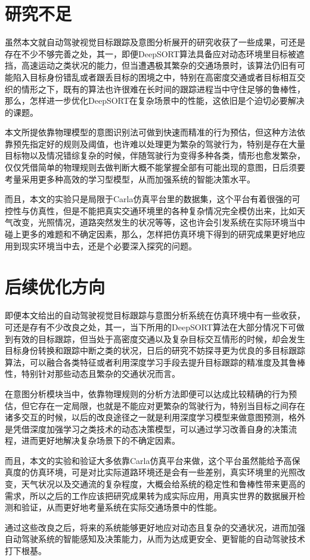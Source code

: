 \section{研究不足}

虽然本文就自动驾驶视觉目标跟踪及意图分析展开的研究收获了一些成果，可还是存在不少不够完善之处，其一，即便DeepSORT算法具备应对动态环境里目标被遮挡，高速运动之类状况的能力，但当遭遇极其繁杂的交通场景时，该算法仍旧有可能陷入目标身份错乱或者跟丢目标的困境之中，特别在高密度交通或者目标相互交织的情形之下，既有的算法也许很难在长时间的跟踪进程当中守住足够的鲁棒性，那么，怎样进一步优化DeepSORT在复杂场景中的性能，这依旧是个迫切必要解决的课题。

本文所提依靠物理模型的意图识别法可做到快速而精准的行为预估，但这种方法依靠预先指定好的规则及阈值，也许难以处理更为繁杂的驾驶行为，特别是存在大量目标物以及情况错综复杂的时候，伴随驾驶行为变得多种各类，情形也愈发繁杂，仅仅凭借简单的物理规则去做判断大概不能掌握全部有可能出现的意图，日后须要考量采用更多种高效的学习型模型，从而加强系统的智能决策水平。

而且，本文的实验只是局限于Carla仿真平台里的数据集，这个平台有着很强的可控性与仿真性，但是不能把真实交通环境里的各种复杂情况完全模仿出来，比如天气改变，光照情况，道路突然发生的状况等等，这也许会引发系统在实际环境当中碰上更多的难题和不确定因素，那么，怎样把仿真环境下得到的研究成果更好地应用到现实环境当中去，还是个必要深入探究的问题。


\section{后续优化方向}

即便本文给出的自动驾驶视觉目标跟踪与意图分析系统在仿真环境中有一些收获，可还是存有不少改良之处，其一，当下所用的DeepSORT算法在大部分情况下可做到有效的目标跟踪，但当处于高密度交通以及复杂目标交互情形的时候，却会发生目标身份转换和跟踪中断之类的状况，日后的研究不妨探寻更为优良的多目标跟踪算法，可以融合各类特征或者利用深度学习手段去提升目标跟踪的精准度及其鲁棒性，特别针对那些动态且繁杂的交通状况而言。

在意图分析模块当中，依靠物理规则的分析方法即便可以达成比较精确的行为预估，但它存在一定局限，也就是不能应对更繁杂的驾驶行为，特别当目标之间存在诸多交互的时候，以后的改良途径之一就是利用深度学习模型来做意图预测，格外是凭借深度加强学习之类技术的动态决策模型，可以通过学习改善自身的决策流程，进而更好地解决复杂场景下的不确定因素。

而且，本文的实验和验证大多依靠Carla仿真平台来做，这个平台虽然能给予高保真度的仿真环境，可是对比实际道路环境还是会有一些差别，真实环境里的光照改变，天气状况以及交通流的复杂程度，大概会给系统的稳定性和鲁棒性带来更高的需求，所以之后的工作应该把研究成果转为成实际应用，用真实世界的数据展开检测和验证，从而更好地考量系统在实际交通场景中的性能。

通过这些改良之后，将来的系统能够更好地应对动态且复杂的交通状况，进而加强自动驾驶系统的智能感知及决策能力，从而为达成更安全、更智能的自动驾驶技术打下根基。




\begin{tabular}{l l}
\end{tabular}
